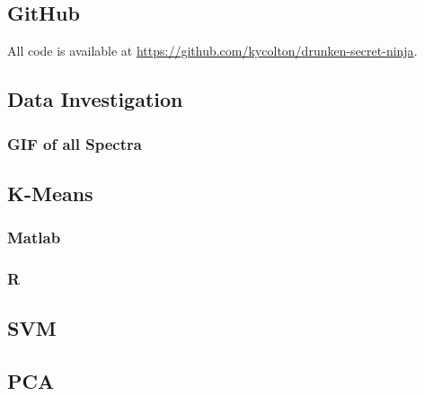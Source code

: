 \documentclass[10pt,letterpaper]{article}
\begin{document}
\subsection{GitHub}
All code is available at \url{https://github.com/kycolton/drunken-secret-ninja}.
\subsection{Data Investigation}
\subsubsection{GIF of all Spectra}
\subsection{K-Means}
\subsubsection{Matlab}
\subsubsection{R}

\subsection{SVM}

\subsection{PCA}

\end{document}
